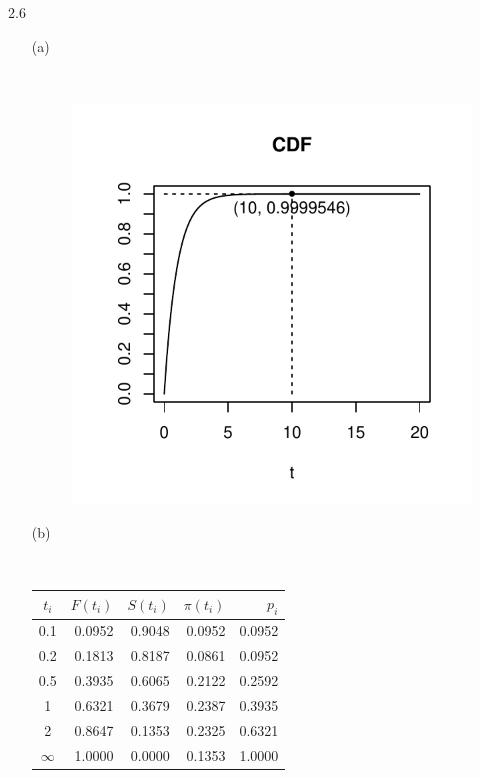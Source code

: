 \documentclass[paper=a4, fontsize=11pt]{scrartcl} %
\numberwithin{equation}{section} %
\numberwithin{figure}{section} %
\numberwithin{table}{section} %
\begin{document}
2.6
\begin{itemize}
	\item[(a)]{\
		\begin{figure}[h]
			\centering
			\includegraphics[width = 2.3 in]{2_6_a.pdf}
		\end{figure}	
	}
	
	\item[(b)]{\ \\ 
		\begin{tabular}{c | rrrr}
			$t_i$		&	$F(t_i)$		&	$S(t_i)$	&	$\pi(t_i)$	&	$p_i$ 	\\ \hline
			0.1 		&	0.0952 		&	0.9048 	&	0.0952 	&	0.0952	\\
			0.2 		&	0.1813 		&	0.8187 	&	0.0861 	&	0.0952	\\
			0.5 		&	0.3935 		&	0.6065 	&	0.2122 	&	0.2592	\\
			1 		&	0.6321 		&	0.3679	&	0.2387 	&	0.3935	\\
			2 		&	0.8647 		&	0.1353 	&	0.2325 	&	0.6321	\\
			$\infty$ 	&	1.0000 		&	0.0000 	&	0.1353 	&	1.0000	\\
		\end{tabular}
	}
\end{itemize}
\end{document}
